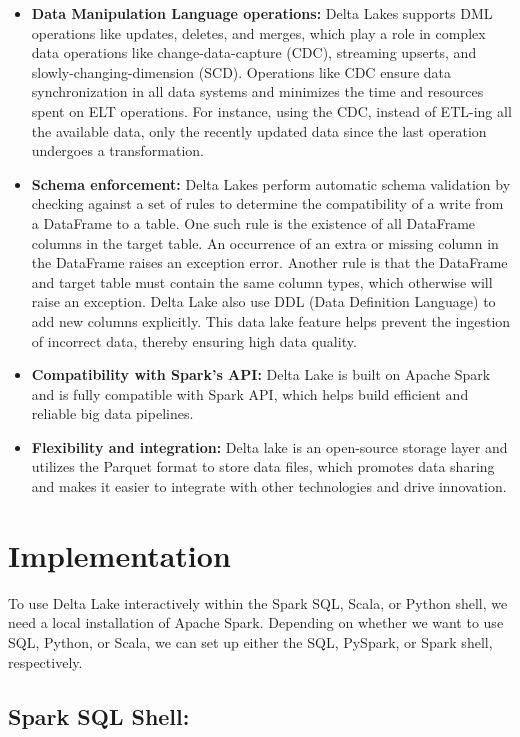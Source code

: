 \begin{itemize}
    \item[\textbullet] \textbf{Data Manipulation Language operations:} Delta Lakes supports DML operations like updates, deletes, and merges, which play a role in complex data operations like change-data-capture (CDC), streaming upserts, and slowly-changing-dimension (SCD). Operations like CDC ensure data synchronization in all data systems and minimizes the time and resources spent on ELT operations. For instance, using the CDC, instead of ETL-ing all the available data, only the recently updated data since the last operation undergoes a transformation.
    \item[\textbullet] \textbf{Schema enforcement:} Delta Lakes perform automatic schema validation by checking against a set of rules to determine the compatibility of a write from a DataFrame to a table. One such rule is the existence of all DataFrame columns in the target table. An occurrence of an extra or missing column in the DataFrame raises an exception error. Another rule is that the DataFrame and target table must contain the same column types, which otherwise will raise an exception. Delta Lake also use DDL (Data Definition Language) to add new columns explicitly. This data lake feature helps prevent the ingestion of incorrect data, thereby ensuring high data quality.
    \item[\textbullet] \textbf{Compatibility with Spark's API:} Delta Lake is built on Apache Spark and is fully compatible with Spark API, which helps build efficient and reliable big data pipelines.
    \item[\textbullet] \textbf{Flexibility and integration:} Delta lake is an open-source storage layer and utilizes the Parquet format to store data files, which promotes data sharing and makes it easier to integrate with other technologies and drive innovation.
\end{itemize}

\section{Implementation}
To use Delta Lake interactively within the Spark SQL, Scala, or Python shell, we need a local installation of Apache Spark. Depending on whether we want to use SQL, Python, or Scala, we can set up either the SQL, PySpark, or Spark shell, respectively.

\subsection*{Spark SQL Shell:}

